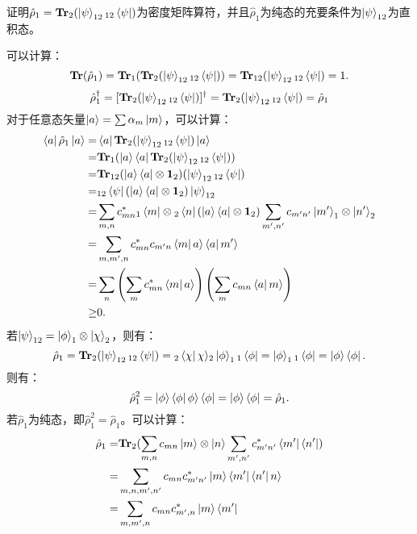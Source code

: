 \documentclass[reqno,a4paper,12pt]{amsart}
\begin{document}
证明$\hat{\rho}_1 = \mathbf{Tr}_2(\ket{\psi}_{12}{ }_{12}\bra{\psi})$为密度矩阵算符，并且$\hat{\rho}_1$为纯态的充要条件为$\ket{\psi}_{12}$为直积态。
\begin{tcolorbox}[breakable, colback = black!5!white, colframe = black]
可以计算：
\[
	\mathbf{Tr}(\hat{\rho}_1) = \mathbf{Tr}_1(\mathbf{Tr}_2 (\ket{\psi}_{12} { }_{12}\bra{\psi})) = \mathbf{Tr}_{12} (\ket{\psi}_{12} { }_{12}\bra{\psi}) = 1.
\]
\[
	\hat{\rho}_1^\dagger = [\mathbf{Tr}_2(\ket{\psi}_{12} { }_{12}\bra{\psi})]^\dagger = \mathbf{Tr}_2(\ket{\psi}_{12} { }_{12}\bra{\psi}) = \hat{\rho}_1
\]
对于任意态矢量$\ket{a} = \sum \alpha_m \ket{m}$，可以计算：
\begin{align*}
	\bra{a} \hat{\rho}_1 \ket{a} =& \bra{a} \mathbf{Tr}_2(\ket{\psi}_{12} { }_{12}\bra{\psi}) \ket{a} \\
	=& \mathbf{Tr}_1(\ket{a}\bra{a} \mathbf{Tr}_2(\ket{\psi}_{12} { }_{12}\bra{\psi}) ) \\
	=& \mathbf{Tr}_{12} (\ket{a}\bra{a}\otimes\mathbf{1}_2) (\ket{\psi}_{12} { }_{12}\bra{\psi}) \\
	=& { }_{12}\bra{\psi} (\ket{a}\bra{a}\otimes \mathbf{1}_2) \ket{\psi}_{12} \\
	=& \sum_{m,n}c_{mn}^* { }_1\bra{m}\otimes { }_2\bra{n} (\ket{a}\bra{a}\otimes \mathbf{1}_2) \sum_{m',n'}c_{m'n'} \ket{m'}_1 \otimes \ket{n'}_2 \\
	=& \sum_{m,m',n} c_{mn}^*c_{m'n} \bra{m} a \rangle \bra{a} m' \rangle \\
	=& \sum_n \left( \sum_{m} c_{mn}^* \bra{m} a\rangle \right) \left( \sum_{m} c_{mn} \bra{a} m \rangle \right) \\
	\geq& 0.
\end{align*}
若$\ket{\psi}_{12} = \ket{\phi}_1 \otimes \ket{\chi}_2$，则有：
\[
	\hat{\rho}_1 = \mathbf{Tr}_2(\ket{\psi}_{12} { }_{12}\bra{\psi}) = { }_2\bra{\chi} \chi \rangle_2 \ket{\phi}_1 { }_1 \bra{\phi} = \ket{\phi}_1 { }_1 \bra{\phi} = \ket{\phi} \bra{\phi}.
\]
则有：
\[
	\hat{\rho}_1^2 =  \ket{\phi} \bra{\phi} \phi \rangle \bra{\phi} =  \ket{\phi} \bra{\phi} = \hat{\rho}_1.
\]
若$\hat{\rho}_1$为纯态，即$\hat{\rho}_1^2 = \hat{\rho}_1$。可以计算：
\begin{align*}
	\hat{\rho}_1 =& \mathbf{Tr}_2 (\sum_{m,n} c_{mn} \ket{m}\otimes \ket{n} \sum_{m',n'} c_{m'n'}^* \bra{m'} \bra{n'}) \\
	=& \sum_{m,n,m',n'} c_{mn} c_{m'n'}^* \ket{m} \bra{m'} \bra{n'} n \rangle \\
	=& \sum_{m,m',n} c_{mn} c_{m',n}^* \ket{m} \bra{m'} \\

\end{align*}
\end{tcolorbox}
\end{document}

